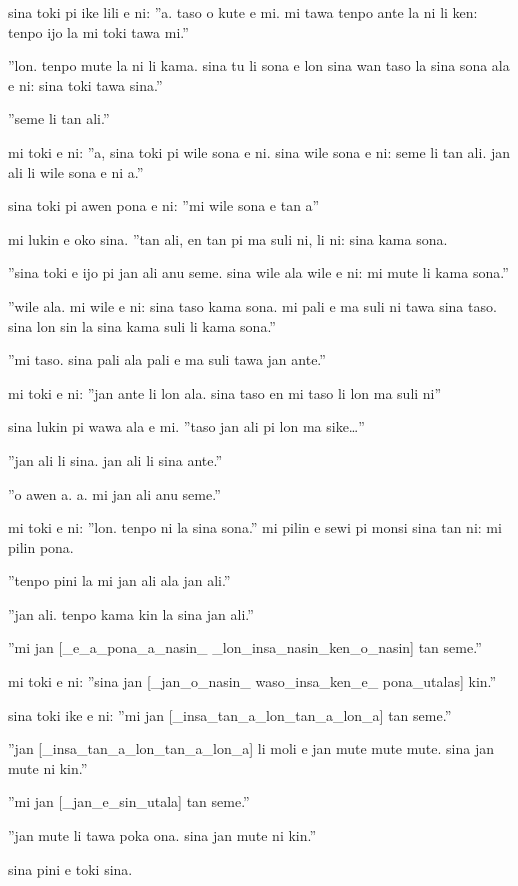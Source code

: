 \documentclass{article}
\begin{document}
sina toki pi ike lili e ni: ''a. taso o kute e mi. mi tawa tenpo ante la ni li ken: tenpo ijo la mi toki tawa mi.''

''lon. tenpo mute la ni li kama. sina tu li sona e lon sina wan taso la sina sona ala e ni: sina toki tawa sina.''

''seme li tan ali.''

mi toki e ni: ''a, sina toki pi wile sona e ni. sina wile sona e ni: seme li tan ali. jan ali li wile sona e ni a.''

sina toki pi awen pona e ni: ''mi wile sona e tan a''

mi lukin e oko sina. ''tan ali, en tan pi ma suli ni, li ni: sina kama sona.

''sina toki e ijo pi jan ali anu seme. sina wile ala wile e ni: mi mute li kama sona.''

''wile ala. mi wile e ni: sina taso kama sona. mi pali e ma suli ni tawa sina taso. sina lon sin la sina kama suli li kama sona.''

''mi taso. sina pali ala pali e ma suli tawa jan ante.''

mi toki e ni: ''jan ante li lon ala. sina taso en mi taso li lon ma suli ni''

sina lukin pi wawa ala e mi. ''taso jan ali pi lon ma sike…''

''jan ali li sina. jan ali li sina ante.''

''o awen a. a. mi jan ali anu seme.''

mi toki e ni: ''lon. tenpo ni la sina sona.'' mi pilin e sewi pi monsi sina tan ni: mi pilin pona.

''tenpo pini la mi jan ali ala jan ali.''

''jan ali. tenpo kama kin la sina jan ali.''

''mi jan {[}\_e\_a\_pona\_a\_nasin\_  \_lon\_insa\_nasin\_ken\_o\_nasin{]} tan seme.''

mi toki e ni: ''sina jan {[}\_jan\_o\_nasin\_ waso\_insa\_ken\_e\_ pona\_utalas{]} kin.''

sina toki ike e ni: ''mi jan {[}\_insa\_tan\_a\_lon\_tan\_a\_lon\_a{]} tan seme.''

''jan {[}\_insa\_tan\_a\_lon\_tan\_a\_lon\_a{]} li moli e jan mute mute mute. sina jan mute ni kin.''

''mi jan {[}\_jan\_e\_sin\_utala{]} tan seme.''

''jan mute li tawa poka ona. sina jan mute ni kin.''

sina pini e toki sina.
\end{document}
